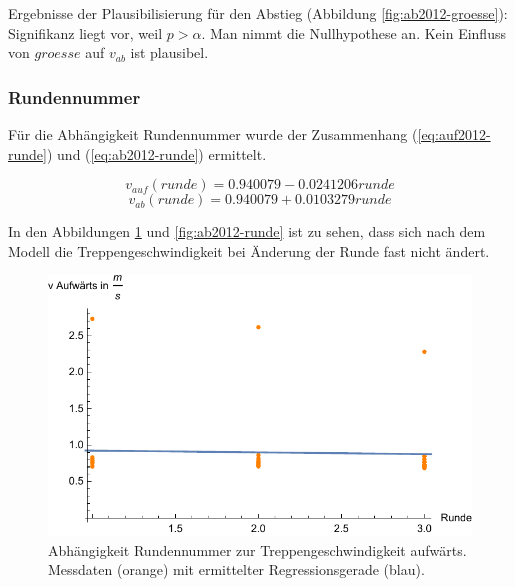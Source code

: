 Ergebnisse der Plausibilisierung für den Abstieg
(Abbildung \ref{fig:ab2012-groesse}):
Signifikanz liegt vor, weil $p > \alpha$. Man nimmt die
Nullhypothese an. Kein Einfluss von $groesse$ auf $v_{ab}$ ist plausibel.


\subsubsection{Rundennummer}


Für die Abhängigkeit Rundennummer wurde 
der Zusammenhang (\ref{eq:auf2012-runde}) und (\ref{eq:ab2012-runde}) ermittelt.

\begin{equation} \label{eq:auf2012-runde}
v_{auf}(runde) = 0.940079 - 0.0241206 runde
\end{equation}
\begin{equation} \label{eq:ab2012-runde}
v_{ab}(runde) = 0.940079 + 0.0103279 runde
\end{equation}

In den Abbildungen \ref{fig:auf2012-runde} und \ref{fig:ab2012-runde} ist 
zu sehen, dass sich nach dem Modell die Treppengeschwindigkeit bei Änderung der Runde fast nicht ändert. 

\begin{figure} \centering 
	\includegraphics[]{abbildungen/regression/2012/auf-runde.pdf}
	
	\caption{Abhängigkeit Rundennummer zur Treppengeschwindigkeit aufwärts. Messdaten (orange) mit ermittelter Regressionsgerade (blau). \label{fig:auf2012-runde}}
\end{figure}

